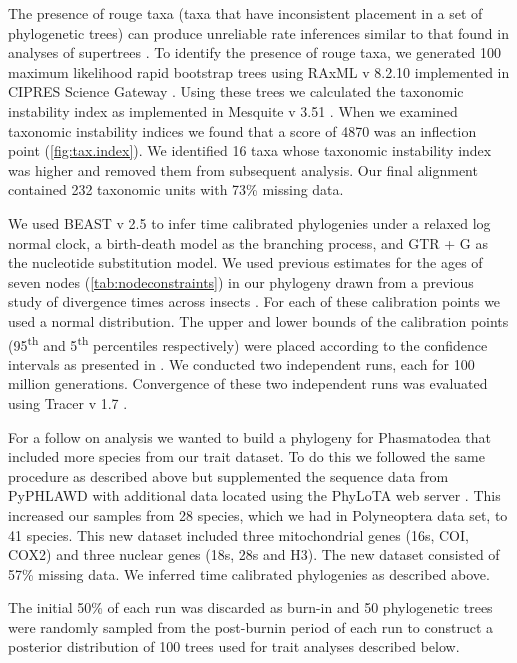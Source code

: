 The presence of rouge taxa (taxa that have inconsistent placement in a set of phylogenetic trees) can produce unreliable rate inferences similar to that found in analyses of supertrees \citep{aberer2012roguetaxa, rabosky2015b}.
To identify the presence of rouge taxa, we generated 100 maximum likelihood rapid bootstrap trees using RAxML v 8.2.10 implemented in CIPRES Science Gateway \citep{stamatakis2014raxml,miller2010cipres}.
Using these trees we calculated the taxonomic instability index as implemented in Mesquite v 3.51 \citep{maddison2018mesquite}.
When we examined taxonomic instability indices we found that a score of 4870 was an inflection point (\cref{fig:tax.index}).
We identified 16 taxa whose taxonomic instability index was higher and removed them from subsequent analysis.
Our final alignment contained 232 taxonomic units with 73\% missing data.

We used BEAST v 2.5 \citep{bouckaert2014beast} to infer time calibrated phylogenies under a relaxed log normal clock, a birth-death model as the branching process, and GTR + G as the nucleotide substitution model.
We used previous estimates for the ages of seven nodes (\cref{tab:nodeconstraints}) in our phylogeny drawn from a previous study of divergence times across insects \citep{misof2014phylogenomics}.
For each of these calibration points we used a normal distribution.
The upper and lower bounds of the calibration points (95\textsuperscript{th} and 5\textsuperscript{th} percentiles respectively) were placed according to the confidence intervals as presented in \citet{misof2014phylogenomics}. 
We conducted two independent runs, each for 100 million generations.
Convergence of these two independent runs was evaluated using Tracer v 1.7 \citep{rambaut2018tracer}.

For a follow on analysis we wanted to build a phylogeny for Phasmatodea that included more species from our trait dataset.
To do this we followed the same procedure as described above but supplemented the sequence data from PyPHLAWD with additional data located using the PhyLoTA web server \citep{sanderson2008}.
This increased our samples from 28 species, which we had in Polyneoptera data set, to 41 species. 
This new dataset included three mitochondrial genes (16s, COI, COX2) and three nuclear genes (18s, 28s and H3).
The new dataset consisted of 57\% missing data.
We inferred time calibrated phylogenies as described above.

The initial 50\% of each run was discarded as burn-in and 50 phylogenetic trees were randomly sampled from the post-burnin period of each run to construct a posterior distribution of 100 trees used for trait analyses described below.

